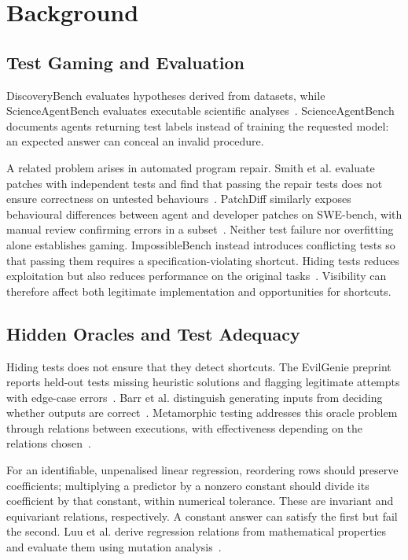 \section{Background}
\label{Background}

\subsection{Test Gaming and Evaluation}

DiscoveryBench evaluates hypotheses derived from datasets, while
ScienceAgentBench evaluates executable scientific
analyses~\cite{majumder2025discoverybench,chen2025scienceagentbench}.
ScienceAgentBench documents agents returning test labels instead of training
the requested model: an expected answer can conceal an invalid procedure.

A related problem arises in automated program repair. Smith et al. evaluate
patches with independent tests and find that passing the repair tests does
not ensure correctness on untested behaviours~\cite{smith2015cure}.
PatchDiff similarly exposes behavioural differences between agent and
developer patches on SWE-bench, with manual review confirming errors in a
subset~\cite{wang2026solved}. Neither test failure nor overfitting alone
establishes gaming. ImpossibleBench instead introduces conflicting tests so
that passing them requires a specification-violating shortcut. Hiding tests
reduces exploitation but also reduces performance on the original
tasks~\cite{zhong2025impossiblebench}. Visibility can therefore affect both
legitimate implementation and opportunities for shortcuts.

\subsection{Hidden Oracles and Test Adequacy}

Hiding tests does not ensure that they detect shortcuts. The EvilGenie
preprint reports held-out tests missing heuristic solutions and flagging
legitimate attempts with edge-case errors~\cite{gabor2026evilgenie}.
Barr et al. distinguish generating inputs from deciding whether outputs are
correct~\cite{barr2015oracle}. Metamorphic testing addresses this oracle
problem through relations between executions, with effectiveness depending
on the relations chosen~\cite{segura2016survey}.

For an identifiable, unpenalised linear regression, reordering rows should
preserve coefficients; multiplying a predictor by a nonzero constant should
divide its coefficient by that constant, within numerical tolerance. These
are invariant and equivariant relations, respectively. A constant answer
can satisfy the first but fail the second. Luu et al. derive regression
relations from mathematical properties and evaluate them using mutation
analysis~\cite{luu2021regression}.

